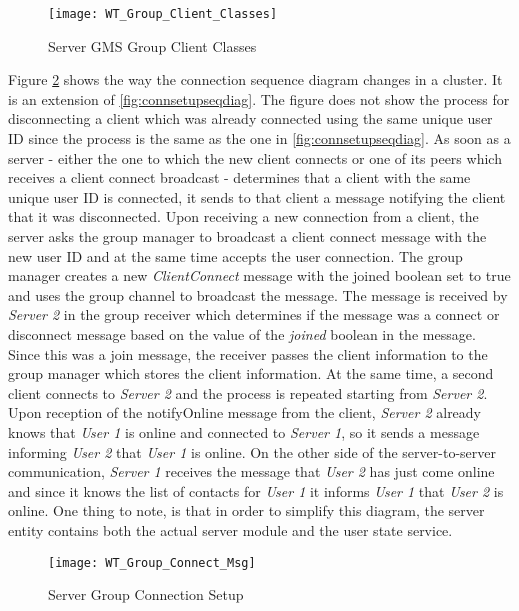 \begin{figure}
	\centering
	\texttt{[image: WT\_Group\_Client\_Classes]}
	\caption{Server GMS Group Client Classes}
	\label{fig:groupclient}
\end{figure}

Figure \ref{fig:groupconnectmsg} shows the way the connection sequence diagram changes in a cluster. It is an extension of \ref{fig:connsetupseqdiag}. The figure does not show the process for disconnecting a client which was already connected using the same unique user ID since the process is the same as the one in \ref{fig:connsetupseqdiag}. As soon as a server - either the one to which the new client connects or one of its peers which receives a client connect broadcast - determines that a client with the same unique user ID is connected, it sends to that client a message notifying the client that it was disconnected. Upon receiving a new connection from a client, the server asks the group manager to broadcast a client connect message with the new user ID and at the same time accepts the user connection. The group manager creates a new \textit{ClientConnect} message with the joined boolean set to true and uses the group channel to broadcast the message. The message is received by \textit{Server 2} in the group receiver which determines if the message was a connect or disconnect message based on the value of the \textit{joined} boolean in the message. Since this was a join message, the receiver passes the client information to the group manager which stores the client information. At the same time, a second client connects to \textit{Server 2} and the process is repeated starting from \textit{Server 2}. Upon reception of the notifyOnline message from the client, \textit{Server 2} already knows that \textit{User 1} is online and connected to \textit{Server 1}, so it sends a message informing \textit{User 2} that \textit{User 1} is online. On the other side of the server-to-server communication, \textit{Server 1} receives the message that \textit{User 2} has just come online and since it knows the list of contacts for \textit{User 1} it informs \textit{User 1} that \textit{User 2} is online. One thing to note, is that in order to simplify this diagram, the server entity contains both the actual server module and the user state service.

\begin{figure}
	\centering
	\texttt{[image: WT\_Group\_Connect\_Msg]}
	\caption{Server Group Connection Setup}
	\label{fig:groupconnectmsg}
\end{figure}

